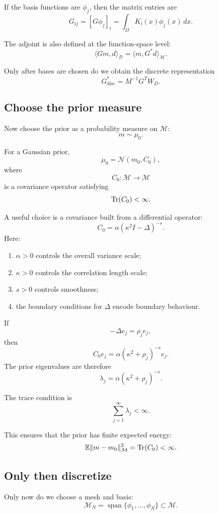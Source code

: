 \documentclass[11pt,a4paper]{book}
\newcommand{\M}{\mathcal{M}}      %
\newcommand{\D}{\mathcal{D}}      %
\newcommand{\prior}{\mu_0}
\newcommand{\G}{G}
\newcommand{\Gadj}{G^\ast}
\begin{document}
If the basis functions are $\phi_j$, then the matrix entries are
\[
    G_{ij}
    =
    [\G\phi_j]_i
    =
    \int_\Omega K_i(x)\phi_j(x)\,dx.
\]

The adjoint is also defined at the function-space level:
\[
    \langle \G m,d\rangle_{\D}
    =
    \langle m,\Gadj d\rangle_{\M}.
\]

Only after bases are chosen do we obtain the discrete representation
\[
    G^\ast_{\mathrm{disc}}
    =
    M^{-1}G^T W_D.
\]

\subsection{Choose the prior measure}

Now choose the prior as a probability measure on $\M$:
\[
    m\sim\prior.
\]

For a Gaussian prior,
\[
    \prior=\mathcal{N}(m_0,C_0),
\]
where
\[
    C_0:\M\to\M
\]
is a covariance operator satisfying
\[
    \Tr(C_0)<\infty.
\]

A useful choice is a covariance built from a differential operator:
\[
    C_0
    =
    \alpha(\kappa^2 I-\Delta)^{-s}.
\]
Here:
\begin{enumerate}[label=\arabic*.]
    \item $\alpha>0$ controls the overall variance scale;
    \item $\kappa>0$ controls the correlation length scale;
    \item $s>0$ controls smoothness;
    \item the boundary conditions for $\Delta$ encode boundary behaviour.
\end{enumerate}

If
\[
    -\Delta e_j=\rho_j e_j,
\]
then
\[
    C_0 e_j
    =
    \alpha(\kappa^2+\rho_j)^{-s}e_j.
\]
The prior eigenvalues are therefore
\[
    \lambda_j
    =
    \alpha(\kappa^2+\rho_j)^{-s}.
\]

The trace condition is
\[
    \sum_{j=1}^{\infty}\lambda_j<\infty.
\]

This ensures that the prior has finite expected energy:
\[
    \mathbb{E}\|m-m_0\|_{\M}^2
    =
    \Tr(C_0)
    <
    \infty.
\]

\subsection{Only then discretize}

Only now do we choose a mesh and basis:
\[
    \M_N
    =
    \operatorname{span}\{\phi_1,\ldots,\phi_N\}
    \subset \M.
\]
\end{document}
